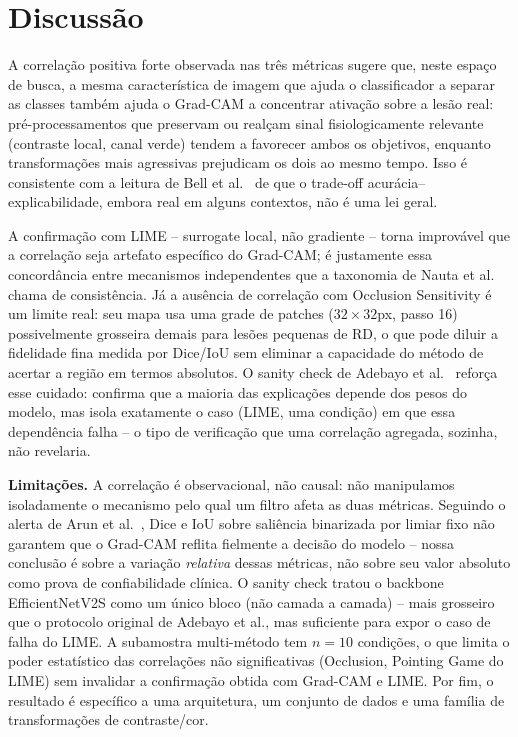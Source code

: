 \documentclass[12pt]{article}
\begin{document}
\section{Discussão}\label{sec:discussao}

A correlação positiva forte observada nas três métricas sugere que, neste
espaço de busca, a mesma característica de imagem que ajuda o classificador
a separar as classes também ajuda o Grad-CAM a concentrar ativação sobre a
lesão real: pré-processamentos que preservam ou realçam sinal
fisiologicamente relevante (contraste local, canal verde) tendem a
favorecer ambos os objetivos, enquanto transformações mais agressivas
prejudicam os dois ao mesmo tempo. Isso é consistente com a leitura de Bell
et al.\ \cite{bell2022justnotsimple} de que o trade-off
acurácia--explicabilidade, embora real em alguns contextos, não é uma lei
geral.

A confirmação com LIME -- surrogate local, não gradiente -- torna
improvável que a correlação seja artefato específico do Grad-CAM; é
justamente essa concordância entre mecanismos independentes que a
taxonomia de Nauta et al.~\cite{nauta2023co12} chama de consistência. Já a
ausência de correlação com Occlusion Sensitivity é um limite real: seu mapa
usa uma grade de patches ($32\times32$px, passo 16) possivelmente grosseira
demais para lesões pequenas de RD, o que pode diluir a fidelidade fina
medida por Dice/IoU sem eliminar a capacidade do método de acertar a região
em termos absolutos. O sanity check de Adebayo et
al.~\cite{adebayo2018sanity} reforça esse cuidado: confirma que a maioria
das explicações depende dos pesos do modelo, mas isola exatamente o caso
(LIME, uma condição) em que essa dependência falha -- o tipo de verificação
que uma correlação agregada, sozinha, não revelaria.

\textbf{Limitações.} A correlação é observacional, não causal: não
manipulamos isoladamente o mecanismo pelo qual um filtro afeta as duas
métricas. Seguindo o alerta de Arun et al.\ \cite{arun2021trustworthiness},
Dice e IoU sobre saliência binarizada por limiar fixo não garantem que o
Grad-CAM reflita fielmente a decisão do modelo -- nossa conclusão é sobre a
variação \emph{relativa} dessas métricas, não sobre seu valor absoluto como
prova de confiabilidade clínica. O sanity check tratou o backbone
EfficientNetV2S como um único bloco (não camada a camada) -- mais
grosseiro que o protocolo original de Adebayo et al., mas suficiente para
expor o caso de falha do LIME. A subamostra multi-método tem $n=10$
condições, o que limita o poder estatístico das correlações não
significativas (Occlusion, Pointing Game do LIME) sem invalidar a
confirmação obtida com Grad-CAM e LIME. Por fim, o resultado é específico a
uma arquitetura, um conjunto de dados e uma família de transformações de
contraste/cor.
\end{document}
